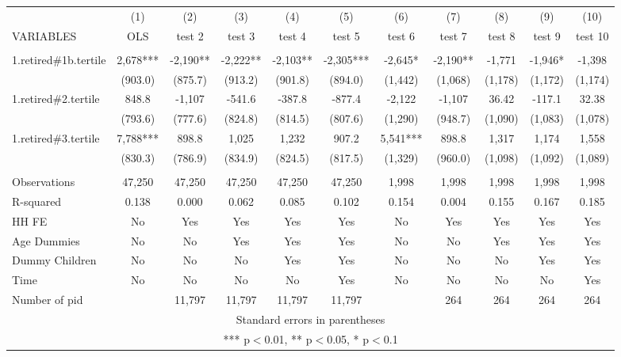 \begin{tabular}{lcccccccccc} \hline
 & (1) & (2) & (3) & (4) & (5) & (6) & (7) & (8) & (9) & (10) \\
VARIABLES & OLS & test 2 & test 3 & test 4 & test 5 & test 6 & test 7 & test 8 & test 9 & test 10 \\ \hline
 &  &  &  &  &  &  &  &  &  &  \\
1.retired\#1b.tertile & 2,678*** & -2,190** & -2,222** & -2,103** & -2,305*** & -2,645* & -2,190** & -1,771 & -1,946* & -1,398 \\
 & (903.0) & (875.7) & (913.2) & (901.8) & (894.0) & (1,442) & (1,068) & (1,178) & (1,172) & (1,174) \\
1.retired\#2.tertile & 848.8 & -1,107 & -541.6 & -387.8 & -877.4 & -2,122 & -1,107 & 36.42 & -117.1 & 32.38 \\
 & (793.6) & (777.6) & (824.8) & (814.5) & (807.6) & (1,290) & (948.7) & (1,090) & (1,083) & (1,078) \\
1.retired\#3.tertile & 7,788*** & 898.8 & 1,025 & 1,232 & 907.2 & 5,541*** & 898.8 & 1,317 & 1,174 & 1,558 \\
 & (830.3) & (786.9) & (834.9) & (824.5) & (817.5) & (1,329) & (960.0) & (1,098) & (1,092) & (1,089) \\
 &  &  &  &  &  &  &  &  &  &  \\
Observations & 47,250 & 47,250 & 47,250 & 47,250 & 47,250 & 1,998 & 1,998 & 1,998 & 1,998 & 1,998 \\
R-squared & 0.138 & 0.000 & 0.062 & 0.085 & 0.102 & 0.154 & 0.004 & 0.155 & 0.167 & 0.185 \\
HH FE & No & Yes & Yes & Yes & Yes & No & Yes & Yes & Yes & Yes \\
Age Dummies & No & No & Yes & Yes & Yes & No & No & Yes & Yes & Yes \\
Dummy Children & No & No & No & Yes & Yes & No & No & No & Yes & Yes \\
Time & No & No & No & No & Yes & No & No & No & No & Yes \\
 Number of pid &  & 11,797 & 11,797 & 11,797 & 11,797 &  & 264 & 264 & 264 & 264 \\ \hline
\multicolumn{11}{c}{ Standard errors in parentheses} \\
\multicolumn{11}{c}{ *** p$<$0.01, ** p$<$0.05, * p$<$0.1} \\
\end{tabular}
